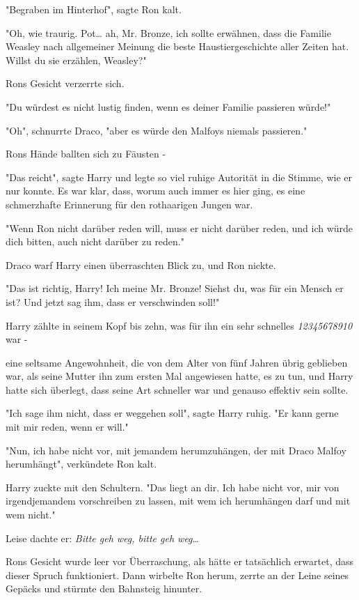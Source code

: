 {"Begraben im Hinterhof", sagte Ron kalt.

"Oh, wie traurig. Pot… ah, Mr. Bronze, ich sollte erwähnen, dass die Familie Weasley nach allgemeiner Meinung die beste Haustiergeschichte aller Zeiten hat. Willst du sie erzählen, Weasley?"

Rons Gesicht verzerrte sich.

"Du würdest es nicht lustig finden, wenn es deiner Familie passieren würde!"

"Oh", schnurrte Draco, "aber es würde den Malfoys niemals passieren."

Rons Hände ballten sich zu Fäusten -

"Das reicht", sagte Harry und legte so viel ruhige Autorität in die Stimme, wie er nur konnte. Es war klar, dass, worum auch immer es hier ging, es eine schmerzhafte Erinnerung für den rothaarigen Jungen war.

"Wenn Ron nicht darüber reden will, muss er nicht darüber reden, und ich würde dich bitten, auch nicht darüber zu reden."

Draco warf Harry einen überraschten Blick zu, und Ron nickte.

"Das ist richtig, Harry! Ich meine Mr. Bronze! Siehst du, was für ein Mensch er ist? Und jetzt sag ihm, dass er verschwinden soll!"

Harry zählte in seinem Kopf bis zehn, was für ihn ein sehr schnelles \emph{12345678910} war -

eine seltsame Angewohnheit, die von dem Alter von fünf Jahren übrig geblieben war, als seine Mutter ihn zum ersten Mal angewiesen hatte, es zu tun, und Harry hatte sich überlegt, dass seine Art schneller war und genauso effektiv sein sollte.

"Ich sage ihm nicht, dass er weggehen soll", sagte Harry ruhig. "Er kann gerne mit mir reden, wenn er will."

"Nun, ich habe nicht vor, mit jemandem herumzuhängen, der mit Draco Malfoy herumhängt", verkündete Ron kalt.

Harry zuckte mit den Schultern. "Das liegt an dir. Ich habe nicht vor, mir von irgendjemandem vorschreiben zu lassen, mit wem ich herumhängen darf und mit wem nicht."

Leise dachte er: \emph{Bitte geh weg, bitte geh weg}…

Rons Gesicht wurde leer vor Überraschung, als hätte er tatsächlich erwartet, dass dieser Spruch funktioniert. Dann wirbelte Ron herum, zerrte an der Leine seines Gepäcks und stürmte den Bahnsteig hinunter.

}
